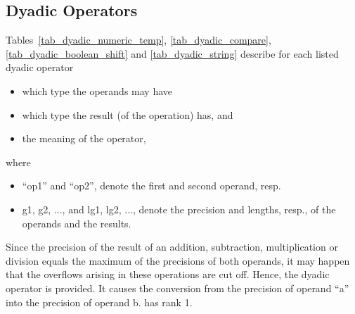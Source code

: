 \FloatBarrier
\subsection{Dyadic Operators}   %
\label{sec_dyadic_operators}

Tables~\ref{tab_dyadic_numeric_temp},
 \ref{tab_dyadic_compare}, \ref{tab_dyadic_boolean_shift} and 
\ref{tab_dyadic_string} describe for each listed dyadic operator
\begin{itemize}
\item which type the operands may have
\item which type the result (of the operation) has, and
\item the meaning of the operator,
\end{itemize}
where
\begin{itemize}
\item ``op1'' and ``op2'', denote the first and second operand, resp.
\item g1, g2, ..., and lg1, lg2, ..., denote the precision and
lengths, resp., of the operands and the results.
\end{itemize}
Since the precision of the result of an addition, subtraction,
multiplication or division equals the maximum of the precisions of both
operands, it may happen that the overflows arising in these operations
are cut off. Hence, the dyadic operator  is provided.
It causes the conversion from the precision of operand ``a'' into the
precision of operand b.  has rank 1.

